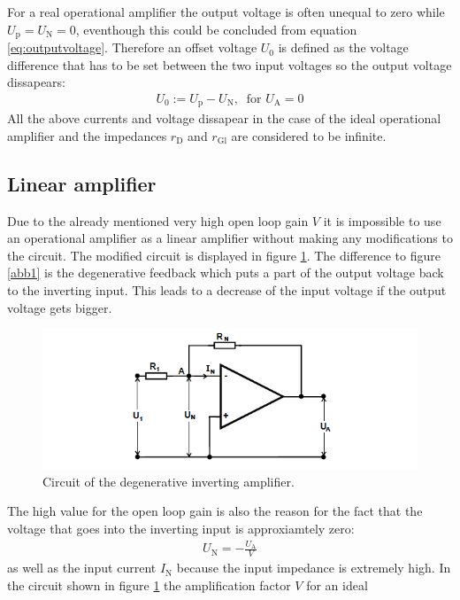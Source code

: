 \noindent For a real operational amplifier the output voltage is often unequal to zero while
$U_{\text{p}} = U_{\text{N}} = 0$, eventhough this could be concluded from equation
\ref{eq:outputvoltage}.
Therefore an offset voltage $U_0$ is defined as the voltage difference that has to
be set between the two input voltages so the output voltage dissapears:
\begin{align*}
    U_0 := U_{\text{p}} - U_{\text{N}} ,~ \text{ for } U_{\text{A}}=0
\end{align*}
All the above currents and voltage dissapear in the case of the ideal operational
amplifier and the impedances $r_{\text{D}}$ and $r_{\text{Gl}}$ are considered to
be infinite.

\subsection{Linear amplifier}
Due to the already mentioned very high open loop gain $V$ it is impossible to use
an operational amplifier as a linear amplifier without making any modifications to
the circuit. The modified circuit is displayed in figure \ref{abb3}. The difference
to figure \ref{abb1} is the degenerative feedback which puts a part of the output
voltage back to the inverting input. This leads to a decrease of the input voltage if
the output voltage gets bigger.
\FloatBarrier
\begin{figure}
  \centering
  \includegraphics[scale=0.5]{degenerative.PNG}
  \caption{Circuit of the degenerative inverting amplifier. \cite{Q1}}
  \label{abb3}
\end{figure}
\FloatBarrier
The high value for the open loop gain is also the reason for the fact that the
voltage that goes into the inverting input is approxiamtely zero:
\begin{align*}
    U_{\text{N}} = - \frac{U_{\text{A}}}{V}
\end{align*}
as well as the input current $I_{\text{N}}$ because the input impedance is extremely
high.
In the circuit shown in figure \ref{abb3} the amplification factor $V$ for an ideal
